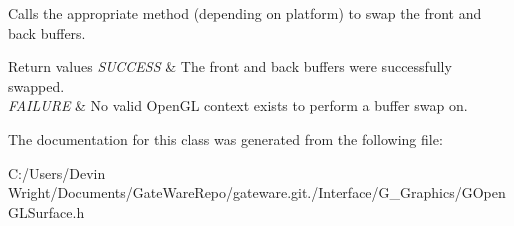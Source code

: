 Calls the appropriate method (depending on platform) to swap the front and back buffers. 


\begin{DoxyRetVals}{Return values}
{\em S\+U\+C\+C\+E\+SS} & The front and back buffers were successfully swapped. \\
\hline
{\em F\+A\+I\+L\+U\+RE} & No valid Open\+GL context exists to perform a buffer swap on. \\
\hline
\end{DoxyRetVals}


The documentation for this class was generated from the following file\+:\begin{DoxyCompactItemize}
\item 
C\+:/\+Users/\+Devin Wright/\+Documents/\+Gate\+Ware\+Repo/gateware.\+git./\+Interface/\+G\+\_\+\+Graphics/G\+Open\+G\+L\+Surface.\+h\end{DoxyCompactItemize}
